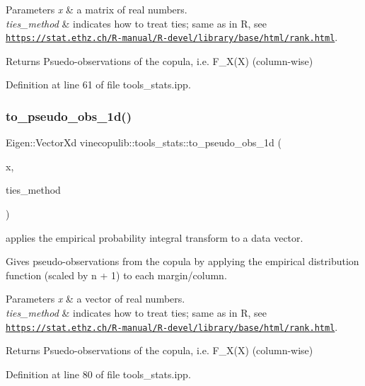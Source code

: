 \begin{DoxyParams}{Parameters}
{\em x} & a matrix of real numbers. \\
\hline
{\em ties\+\_\+method} & indicates how to treat ties; same as in R, see \href{https://stat.ethz.ch/R-manual/R-devel/library/base/html/rank.html}{\tt https\+://stat.\+ethz.\+ch/\+R-\/manual/\+R-\/devel/library/base/html/rank.\+html}. \\
\hline
\end{DoxyParams}
\begin{DoxyReturn}{Returns}
Psuedo-\/observations of the copula, i.\+e. F\+\_\+\+X(\+X) (column-\/wise) 
\end{DoxyReturn}


Definition at line 61 of file tools\+\_\+stats.\+ipp.

\mbox{\label{namespacevinecopulib_1_1tools__stats_a9e4849a2a908703a68e92e0c0633237f}} 
\subsubsection{\texorpdfstring{to\+\_\+pseudo\+\_\+obs\+\_\+1d()}{to\_pseudo\_obs\_1d()}}
{\footnotesize\ttfamily Eigen\+::\+Vector\+Xd vinecopulib\+::tools\+\_\+stats\+::to\+\_\+pseudo\+\_\+obs\+\_\+1d (\begin{DoxyParamCaption}\item[{Eigen\+::\+Vector\+Xd}]{x,  }\item[{std\+::string}]{ties\+\_\+method }\end{DoxyParamCaption})\hspace{0.3cm}{\ttfamily [inline]}}



applies the empirical probability integral transform to a data vector. 

Gives pseudo-\/observations from the copula by applying the empirical distribution function (scaled by n + 1) to each margin/column.


\begin{DoxyParams}{Parameters}
{\em x} & a vector of real numbers. \\
\hline
{\em ties\+\_\+method} & indicates how to treat ties; same as in R, see \href{https://stat.ethz.ch/R-manual/R-devel/library/base/html/rank.html}{\tt https\+://stat.\+ethz.\+ch/\+R-\/manual/\+R-\/devel/library/base/html/rank.\+html}. \\
\hline
\end{DoxyParams}
\begin{DoxyReturn}{Returns}
Psuedo-\/observations of the copula, i.\+e. F\+\_\+\+X(\+X) (column-\/wise) 
\end{DoxyReturn}


Definition at line 80 of file tools\+\_\+stats.\+ipp.

